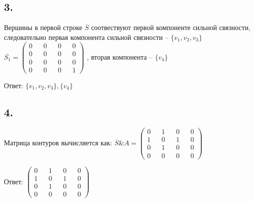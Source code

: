 \documentclass{article}
\begin{document}
\subsection*{3.}
Вершины в первой строке $\overline{S}$ соотвествуют первой компоненте сильной связности,
следовательно первая компонента сильной связности -- $\{v_1, v_2, v_3\}$ \Rightarrow
$
\overline{S_1}
=
\begin{pmatrix}
  0 && 0 && 0 && 0 \\
  0 && 0 && 0 && 0 \\
  0 && 0 && 0 && 0 \\
  0 && 0 && 0 && 1
\end{pmatrix}
$
, вторая компонента -- $\{v_4\}$

Ответ:
$
\{v_1, v_2, v_3\}, \{v_4\}
$

\subsection*{4.}
Матрица контуров вычисляется как:
$
\overline{S} \& A
=
\begin{pmatrix}
  0 && 1 && 0 && 0 \\
  1 && 0 && 1 && 0 \\
  0 && 1 && 0 && 0 \\
  0 && 0 && 0 && 0
\end{pmatrix}
$

Ответ:
$
\begin{pmatrix}
  0 && 1 && 0 && 0 \\
  1 && 0 && 1 && 0 \\
  0 && 1 && 0 && 0 \\
  0 && 0 && 0 && 0
\end{pmatrix}
$
\end{document}
